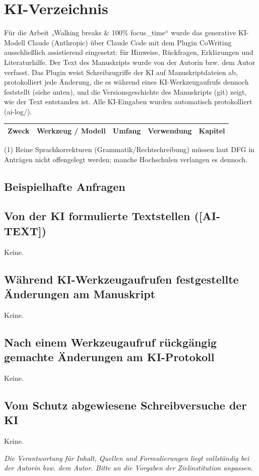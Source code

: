 \section*{KI-Verzeichnis}

Für die Arbeit „Walking breaks \& 100\% focus\_time“ wurde das generative KI-Modell Claude (Anthropic) über Claude Code mit dem Plugin CoWriting ausschließlich assistierend eingesetzt: für Hinweise, Rückfragen, Erklärungen und Literaturhilfe. Der Text des Manuskripts wurde von der Autorin bzw. dem Autor verfasst. Das Plugin weist Schreibzugriffe der KI auf Manuskriptdateien ab, protokolliert jede Änderung, die es während eines KI-Werkzeugaufrufs dennoch feststellt (siehe unten), und die Versionsgeschichte des Manuskripts (git) zeigt, wie der Text entstanden ist. Alle KI-Eingaben wurden automatisch protokolliert (ai-log/).

\begin{tabular}{p{.22\linewidth}p{.18\linewidth}p{.2\linewidth}p{.2\linewidth}p{.1\linewidth}}
\hline
\textbf{Zweck} & \textbf{Werkzeug / Modell} & \textbf{Umfang} & \textbf{Verwendung} & \textbf{Kapitel} \\
\hline
\hline
\end{tabular}

\noindent(1) Reine Sprachkorrekturen (Grammatik/Rechtschreibung) müssen laut DFG in Anträgen nicht offengelegt werden; manche Hochschulen verlangen es dennoch.

\subsection*{Beispielhafte Anfragen}
\begin{itemize}
\end{itemize}
\subsection*{Von der KI formulierte Textstellen ([AI-TEXT])}
Keine.
\subsection*{Während KI-Werkzeugaufrufen festgestellte Änderungen am Manuskript}
Keine.
\subsection*{Nach einem Werkzeugaufruf rückgängig gemachte Änderungen am KI-Protokoll}
Keine.
\subsection*{Vom Schutz abgewiesene Schreibversuche der KI}
Keine.

\textit{Die Verantwortung für Inhalt, Quellen und Formulierungen liegt vollständig bei der Autorin bzw. dem Autor. Bitte an die Vorgaben der Zielinstitution anpassen.}
